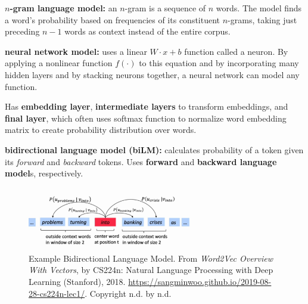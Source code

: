 \begin{frame}{} %



\begin{itemizeSpaced}{5pt}
{\color{DimGray}
    \item \textbf{$n$-gram language model: } an $n$-gram is a sequence of $n$ words. The model finds a word's probability based on frequencies of its constituent $n$-grams, taking just preceding $n-1$ words as context instead of the entire corpus. 
    
    \item \textbf{neural network model: } uses a linear $W \cdot x + b$ function called a neuron. By applying a nonlinear function $f(\cdot)$ to this equation and by incorporating many hidden layers and by stacking neurons together, a neural network can model any function.
    
    Has \textbf{embedding layer}, \textbf{intermediate layers} to transform embeddings, and \textbf{final layer}, which often uses softmax function to normalize word embedding matrix to create probability distribution over words. 
    
    \item \textbf{bidirectional language model (biLM): } calculates probability of a token given its \emph{forward} and \emph{backward} tokens. Uses \textbf{forward} and \textbf{backward language model}s, respectively. 
}%
\end{itemizeSpaced} 
    

    \begin{figure}[h]
    \vspace{-15pt}
    \centering
    \includegraphics[width=0.65\textwidth]{imgs/bidirectional_languagemodel_banking.png}
    \vspace{-10pt}
    \caption{\tiny Example Bidirectional Language Model. From \emph{Word2Vec Overview With Vectors}, by CS224n: Natural Language Processing with Deep Learning (Stanford), 2018. \url{https://sangminwoo.github.io/2019-08-28-cs224n-lec1/}. Copyright n.d. by n.d.}
    \vspace{-5pt}
    \label{fig:bidirectionalLM}
    \end{figure}
    


\end{frame}





